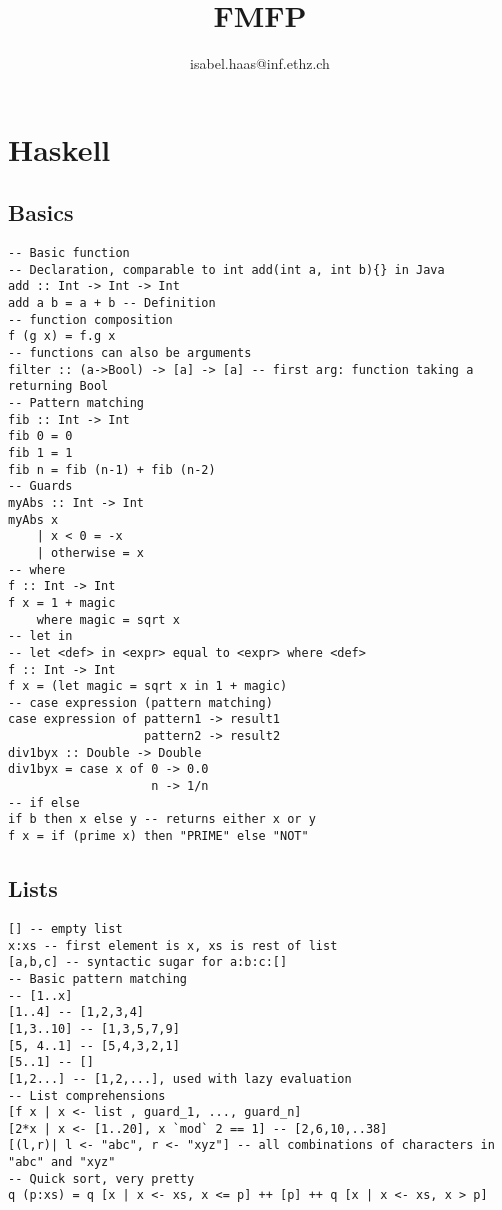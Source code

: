\documentclass[12pt]{article}
\title{FMFP}
\author{isabel.haas@inf.ethz.ch}
\begin{document}
\maketitle



\section{Haskell}
\subsection{Basics}
\begin{verbatim}
-- Basic function
-- Declaration, comparable to int add(int a, int b){} in Java
add :: Int -> Int -> Int 
add a b = a + b -- Definition
-- function composition
f (g x) = f.g x
-- functions can also be arguments
filter :: (a->Bool) -> [a] -> [a] -- first arg: function taking a returning Bool
-- Pattern matching
fib :: Int -> Int
fib 0 = 0
fib 1 = 1
fib n = fib (n-1) + fib (n-2)
-- Guards
myAbs :: Int -> Int 
myAbs x
    | x < 0 = -x
    | otherwise = x
-- where 
f :: Int -> Int
f x = 1 + magic 
    where magic = sqrt x
-- let in
-- let <def> in <expr> equal to <expr> where <def>
f :: Int -> Int
f x = (let magic = sqrt x in 1 + magic)
-- case expression (pattern matching)
case expression of pattern1 -> result1
                   pattern2 -> result2
div1byx :: Double -> Double
div1byx = case x of 0 -> 0.0
                    n -> 1/n
-- if else
if b then x else y -- returns either x or y
f x = if (prime x) then "PRIME" else "NOT" 
\end{verbatim}

\subsection{Lists}
\begin{verbatim}
[] -- empty list
x:xs -- first element is x, xs is rest of list
[a,b,c] -- syntactic sugar for a:b:c:[]
-- Basic pattern matching
-- [1..x]
[1..4] -- [1,2,3,4]
[1,3..10] -- [1,3,5,7,9]
[5, 4..1] -- [5,4,3,2,1] 
[5..1] -- []
[1,2...] -- [1,2,...], used with lazy evaluation
-- List comprehensions
[f x | x <- list , guard_1, ..., guard_n]
[2*x | x <- [1..20], x `mod` 2 == 1] -- [2,6,10,..38]
[(l,r)| l <- "abc", r <- "xyz"] -- all combinations of characters in "abc" and "xyz"
-- Quick sort, very pretty
q (p:xs) = q [x | x <- xs, x <= p] ++ [p] ++ q [x | x <- xs, x > p]
\end{verbatim}
\end{document}
